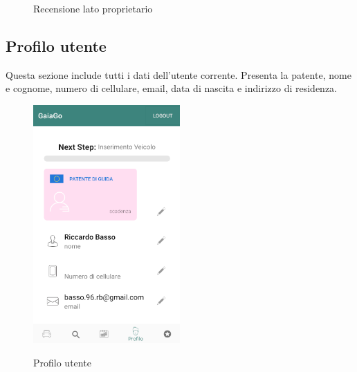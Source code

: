 \begin{itemize}
\begin{figure}[H]
		\caption{Recensione lato proprietario}
		\label{archivia}
	\end{figure}
\end{itemize}
\pagebreak

\subsection{Profilo utente}
Questa sezione include tutti i dati dell'utente corrente. Presenta la patente, nome e cognome, numero di cellulare, email, data di nascita e indirizzo di residenza.
 \begin{figure}[H] 
	\centering 
	\includegraphics[width=0.5\textwidth]{res/images/profilo_utente.png}\\
	\caption{Profilo utente}
	\label{profilo}
\end{figure}
\pagebreak

